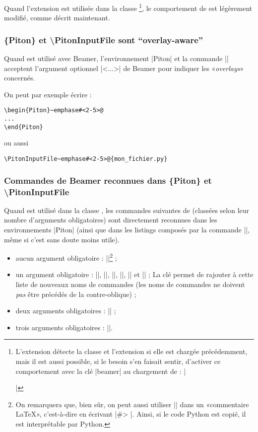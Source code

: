\documentclass[dvipsnames,svgnames]{article}
\begin{document}
\medskip
Quand l'extension  est utilisée dans la classe
\footnote{L'extension  détecte la classe  et
  l'extension  si elle est chargée précédemment, mais il est aussi
  possible, si le besoin s'en faisait sentir, d'activer ce comportement avec la clé
  |beamer| au chargement de  : |\usepackage[beamer]{piton}|}, le comportement
de  est légèrement modifié, comme décrit maintenant.

\subsubsection{\{Piton\} et \textbackslash PitonInputFile sont ``overlay-aware''}

Quand  est utilisé avec Beamer, l'environnement |{Piton}| et la commande
|\PitonInputFile| acceptent l'argument optionnel |<...>| de Beamer pour indiquer les
«\emph{overlays}» concernés.

On peut par exemple écrire :

\begin{Verbatim}
\begin{Piton}~emphase#<2-5>@
...
\end{Piton}
\end{Verbatim}

ou aussi 

\begin{Verbatim}
\PitonInputFile~emphase#<2-5>@{mon_fichier.py}
\end{Verbatim}


\subsubsection{Commandes de Beamer reconnues dans \{Piton\} et \textbackslash PitonInputFile}


Quand  est utilisé dans la classe , les commandes suivantes de
 (classées selon leur nombre d'arguments obligatoires) sont directement
reconnues dans les environnements |{Piton}| (ainsi que dans les listings composés par la
commande |\PitonInputFile|, même si c'est sans doute moins utile).
%
\begin{itemize}
\item aucun argument obligatoire : |\pause|\footnote{On remarquera que, bien sûr, on peut
aussi utiliser |\pause| dans un «commentaire LaTeX», c'est-à-dire en écrivant 
|#> \pause|. Ainsi, si le code Python est copié, il est   interprétable par Python.} ;  
\item un argument obligatoire : |\action|, |\alert|, |\invisible|, |\only|, |\uncover| et
|\visible| ; \newline 
La clé  permet de rajouter à cette liste de nouveaux
noms de commandes (les noms de commandes ne doivent \emph{pas} être précédés de la
contre-oblique) ;  
\item deux arguments obligatoires : |\alt| ;
\item trois arguments obligatoires : |\temporal|.
\end{itemize}
\end{document}
